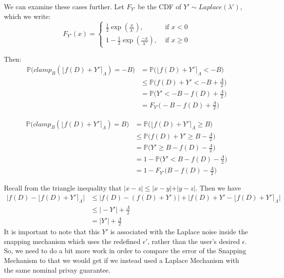 \documentclass[11pt]{scrartcl} %
\begin{document}
We can examine these cases further. Let $F_{Y'}$ be the CDF of $Y' \sim Laplace(\lambda')$, which we write:
\begin{equation}
	F_{Y'}(x) =
		\begin{cases}
			\frac{1}{2} \exp \left( \frac{x}{\lambda'} \right), &\text{ if } x < 0 \\
			1 - \frac{1}{2} \exp \left( \frac{-x}{\lambda'} \right), &\text{ if } x \geq 0
		\end{cases}
\end{equation}

Then:
\begin{align}
	               \mathbb{P} \big( clamp_B\left( \lfloor f(D) + Y' \rceil_{\Lambda} \right) = -B \big) \nonumber &= \mathbb{P} \big( \lfloor f(D) + Y' \rceil_{\Lambda} < -B \big) \nonumber \\
	&\leq \mathbb{P} \big( f(D) + Y' < -B + \frac{\Lambda}{2} \big) \nonumber \\
	&= \mathbb{P} \big( Y' < -B - f(D) + \frac{\Lambda}{2} \big) \nonumber \\
	&= F_{Y'} \big( -B - f(D) + \frac{\Lambda}{2} \big) \nonumber
\end{align}

\begin{align}
	               \mathbb{P} \big( clamp_B\left( \lfloor f(D) + Y' \rceil_{\Lambda} \right) = B \big) \nonumber &= \mathbb{P} \big( \lfloor f(D) + Y' \rceil_{\Lambda} \geq B \big) \nonumber \\
	&\leq \mathbb{P} \big( f(D) + Y' \geq B - \frac{\Lambda}{2} \big) \nonumber \\
	&= \mathbb{P} \big( Y' \geq B - f(D) - \frac{\Lambda}{2} \big) \nonumber \\
	&= 1 - \mathbb{P} \big( Y' < B - f(D) - \frac{\Lambda}{2} \big) \nonumber \\
	&= 1 - F_{Y'} \big( B - f(D) - \frac{\Lambda}{2} \big) \nonumber
\end{align}

Recall from the triangle inequality that $\vert x-z \vert \leq \vert x-y \vert + \vert y-z \vert$. Then we have
\begin{align}
\big\vert f(D) - \lfloor f(D) + Y' \rceil_{\Lambda} \big\vert \nonumber &\leq \big\vert f(D) - (f(D) + Y') \big\vert + \big\vert f(D) + Y' - \lfloor f(D) + Y' \rceil_{\Lambda} \big\vert \nonumber \\
                                                                        &\leq \vert -Y' \vert + \frac{\Lambda}{2} \nonumber \\
	                                                                    &= \vert Y' \vert + \frac{\Lambda}{2} \nonumber
\end{align}
It is important to note that this $Y'$ is associated with the Laplace noise inside the snapping mechanism which uses the redefined $\epsilon'$, rather than the user's desired $\epsilon$. So, we need to do a bit more work in order to compare the error of the Snapping Mechanism to that we would get if we instead used a Laplace Mechanism with the same nominal privay guarantee. \newline
\end{document}
